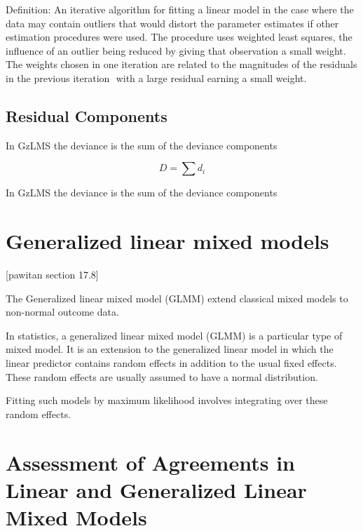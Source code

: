 \documentclass[Main.tex]{subfiles}
\begin{document}
	\noindent Definition: An iterative algorithm for fitting a linear
	model in the case where the data may contain outliers that would
	distort the parameter estimates if other estimation procedures
	were used. The procedure uses weighted least squares, the
	influence of an outlier being reduced by giving that observation a
	small weight. The weights chosen in one iteration are related to
	the magnitudes of the residuals in the previous iteration  with a
	large residual earning a small weight.
	
	\subsection{Residual Components}
	In GzLMS the deviance is the sum of the deviance components
	
	\begin{equation}
	D = \sum d_{i}
	\end{equation}
	
	In GzLMS the deviance is the sum of the deviance components
	
	
	\section{Generalized linear mixed models}
	[pawitan section 17.8]
	
	The Generalized linear mixed model (GLMM) extend classical mixed models to non-normal outcome data.
	
	In statistics, a generalized linear mixed model (GLMM) is a particular type of mixed model. It is an extension to the
	generalized linear model in which the linear predictor contains random effects in addition to the usual fixed effects. These random effects are usually assumed to have a normal distribution.
	
	Fitting such models by maximum likelihood involves integrating over these random effects.
	
	
	
	
	
	
	\section{Assessment of Agreements in Linear and Generalized Linear Mixed Models}
	
\end{document}
